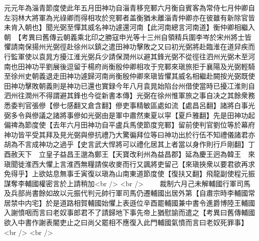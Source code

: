 元元年為淄青節度使此年五月田神功自淄青移兖鄆六月衡自賓客為常侍七月仲卿自左羽林大將軍為光祿卿而得相攻於兖鄆者盖衡猶未離淄青仲卿亦在彼雖有新除官皆未肯入朝也】聞光弼至憚其威名神功遽還河南【此河南總言河南道】衡仲卿相繼入朝　【考異曰舊傳云朝義乘北印之勝寇申光等十三州自領精兵圍李岑於宋州將士皆懼請南保揚州光弼徑赴徐州以鎮之遣田神功擊敗之又曰初光弼將赴臨淮在道舁疾而行監軍使以袁晁方擾江淮光弼兵少請保潤州以避其鋒光弼不從徑往泗州光弼木至河南也田神功平劉展後逗留于楊府尚衡殷仲卿相攻于兖鄆來瑱旅拒于襄陽及光弼輕騎至徐州史朝義退走田神功遽歸河南尚衡殷仲卿來瑱皆懼其威名相繼赴闕按光弼既使田神功擊敗朝義則是神功已還也實録今年八月袁晁始陷台州借使當時已擾冮淮則自泗州往潤州不得謂避其鋒也今從新書本傳】光弼在徐州惟軍旅之事自决之其餘衆務悉委判官張傪【傪七感翻又倉含翻】傪吏事精敏區處如流【處昌呂翻】諸將白事光弼多令與傪議之諸將事傪如光弼由是軍中肅然東夏以寜【夏戶雅翻】先是田神功起偏禆為節度使【去年六月田神功自平盧兵馬使節度兖鄆】留前使判官劉位等於幕府神功皆平受其拜及見光弼與傪抗禮乃大驚徧拜位等曰神功出於行伍不知禮儀諸君亦胡為不言成神功之過乎【史言武大悍將可以禮化居其上者當以身作則行戶剛翻】丁酉赦天下　立皇子益昌王邈為鄭王【天寶改利州為益昌郡】延為慶王迥為韓王　來瑱聞徙淮西大懼上言淮西無糧請俟收麥而行又諷將吏留己【來瑱挾衆以要君欲再求免得乎】上欲姑息無事壬寅復以瑱為山南東道節度使【復扶又翻】飛龍副使程元振謀奪李輔國權密言於上請稍加<br />
<br />
　　裁制六月己未解輔國行軍司馬及兵部尚書餘如故以元振代判元帥行軍司馬仍遷輔國出居外第【自肅宗時李輔國常居禁中内宅】於是道路相賀輔國始懼上表遜位辛酉罷輔國兼中書令進爵博陸王輔國入謝憤咽而言曰老奴事郎君不了請歸地下事先帝上猶慰諭而遣之【考異曰舊傳輔國欲入中書作謝表閽吏止之曰尚父罷相不應復入此門輔國氣憤而言曰老奴死罪事】<br />
<br />
